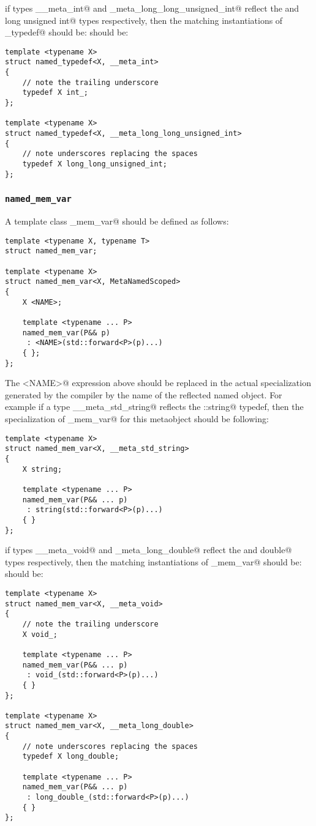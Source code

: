 if types \verb@__meta_int@ and \verb@_meta_long_long_unsigned_int@ reflect the \verb@int@ and \verb@long long unsigned int@
types respectively, then the matching instantiations of \verb@named_typedef@ should be:
should be:

\begin{lstlisting}
template <typename X>
struct named_typedef<X, __meta_int>
{
	// note the trailing underscore
	typedef X int_;
};

template <typename X>
struct named_typedef<X, __meta_long_long_unsigned_int>
{
	// note underscores replacing the spaces
	typedef X long_long_unsigned_int;
};
\end{lstlisting}

\subsubsection{\texttt{named\_mem\_var}}

A template class \verb@named_mem_var@ should be defined as follows:

\begin{lstlisting}
template <typename X, typename T>
struct named_mem_var;

template <typename X>
struct named_mem_var<X, MetaNamedScoped>
{
	X <NAME>;

	template <typename ... P>
	named_mem_var(P&& p)
	 : <NAME>(std::forward<P>(p)...)
	{ };
};
\end{lstlisting}

The \verb@<NAME>@ expression above should be replaced in the actual specialization generated by the compiler
by the name of the reflected named object. For example if a type \verb@__meta_std_string@
reflects the \verb@std::string@ typedef, then the specialization of \verb@named_mem_var@
for this metaobject should be following:

\begin{lstlisting}
template <typename X>
struct named_mem_var<X, __meta_std_string>
{
	X string;

	template <typename ... P>
	named_mem_var(P&& ... p)
	 : string(std::forward<P>(p)...)
	{ }
};
\end{lstlisting}

if types \verb@__meta_void@ and \verb@_meta_long_double@ reflect the \verb@void@ and \verb@long double@
types respectively, then the matching instantiations of \verb@named_mem_var@ should be:
should be:

\begin{lstlisting}
template <typename X>
struct named_mem_var<X, __meta_void>
{
	// note the trailing underscore
	X void_;

	template <typename ... P>
	named_mem_var(P&& ... p)
	 : void_(std::forward<P>(p)...)
	{ }
};

template <typename X>
struct named_mem_var<X, __meta_long_double>
{
	// note underscores replacing the spaces
	typedef X long_double;

	template <typename ... P>
	named_mem_var(P&& ... p)
	 : long_double_(std::forward<P>(p)...)
	{ }
};
\end{lstlisting}

